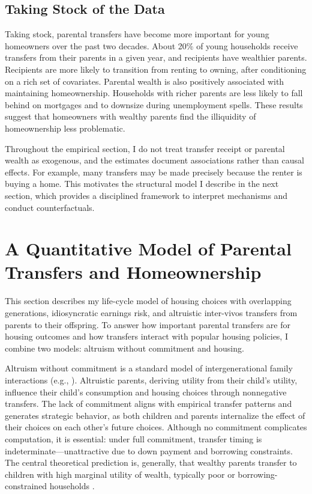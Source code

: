 \documentclass[12pt]{article}
\begin{document}
\subsection{Taking Stock of the Data}
Taking stock, parental transfers have become more important for young homeowners over the past two decades. About 20\% of young households receive transfers from their parents in a given year, and recipients have wealthier parents. Recipients are more likely to transition from renting to owning, after conditioning on a rich set of covariates. Parental wealth is also positively associated with maintaining homeownership. Households with richer parents are less likely to fall behind on mortgages and to downsize during unemployment spells. These results suggest that homeowners with wealthy parents find the illiquidity of homeownership less problematic.

Throughout the empirical section, I do not treat transfer receipt or parental wealth as exogenous, and the estimates document associations rather than causal effects. For example, many transfers may be made precisely because the renter is buying a home. This motivates the structural model I describe in the next section, which provides a disciplined framework to interpret mechanisms and conduct counterfactuals.

\section{A Quantitative Model of Parental Transfers and Homeownership}\label{sec:model}
This section describes my life-cycle model of housing choices with overlapping generations, idiosyncratic earnings risk, and altruistic inter-vivos transfers from parents to their offspring. To answer how important parental transfers are for housing outcomes and how transfers interact with popular housing policies, I combine two models: altruism without commitment and housing.

Altruism without commitment is a standard model of intergenerational family interactions (e.g., \cite{Altonji1997a,Barczyk2018}). Altruistic parents, deriving utility from their child's utility, influence their child's consumption and housing choices through nonnegative transfers. The lack of commitment aligns with empirical transfer patterns and generates strategic behavior, as both children and parents internalize the effect of their choices on each other's future choices. Although no commitment complicates computation, it is essential: under full commitment, transfer timing is indeterminate---unattractive due to down payment and borrowing constraints. The central theoretical prediction is, generally, that wealthy parents transfer to children with high marginal utility of wealth, typically poor or borrowing-constrained households \citep{Chu2020,Barczyk2020}.
\end{document}
